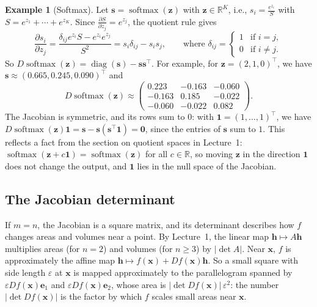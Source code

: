 \documentclass[11pt]{article}
\theoremstyle{definition}
\newtheorem{example}[definition]{Example}
\theoremstyle{plain}
\theoremstyle{remark}
\DeclareMathOperator{\diag}{diag}
\DeclareMathOperator{\softmax}{softmax}
\begin{document}
\begin{example}[Softmax]\label{ex:softmax-jacobian}
    Let $\mathbf{s} = \softmax(\mathbf{z})$ with $\mathbf{z} \in \mathbb{R}^K$, i.e., $s_i = \frac{e^{z_i}}{S}$ with $S = e^{z_1} + \cdots + e^{z_K}$. Since $\frac{\partial S}{\partial z_j} = e^{z_j}$, the quotient rule gives
    \[\frac{\partial s_i}{\partial z_j} = \frac{\delta_{ij} e^{z_i} S - e^{z_i} e^{z_j}}{S^2} = s_i \delta_{ij} - s_i s_j, \qquad \text{where } \delta_{ij} = \begin{cases} 1 & \text{if } i = j, \\ 0 & \text{if } i \neq j. \end{cases}\]
    So $D\softmax(\mathbf{z}) = \diag(\mathbf{s}) - \mathbf{s}\mathbf{s}^\top$. For example, for $\mathbf{z} = (2, 1, 0)^\top$, we have $\mathbf{s} \approx (0.665, 0.245, 0.090)^\top$ and
    \[D\softmax(\mathbf{z}) \approx \begin{pmatrix} 0.223 & -0.163 & -0.060 \\ -0.163 & 0.185 & -0.022 \\ -0.060 & -0.022 & 0.082 \end{pmatrix}.\]
    The Jacobian is symmetric, and its rows sum to $0$: with $\mathbf{1} = (1, \ldots, 1)^\top$, we have $D\softmax(\mathbf{z})\mathbf{1} = \mathbf{s} - \mathbf{s}(\mathbf{s}^\top \mathbf{1}) = \mathbf{0}$, since the entries of $\mathbf{s}$ sum to $1$. This reflects a fact from the section on quotient spaces in Lecture~1: $\softmax(\mathbf{z} + c\mathbf{1}) = \softmax(\mathbf{z})$ for all $c \in \mathbb{R}$, so moving $\mathbf{z}$ in the direction $\mathbf{1}$ does not change the output, and $\mathbf{1}$ lies in the null space of the Jacobian.
\end{example}

\subsection{The Jacobian determinant}

If $m = n$, the Jacobian is a square matrix, and its determinant describes how $f$ changes areas and volumes near a point. By Lecture~1, the linear map $\mathbf{h} \mapsto A\mathbf{h}$ multiplies areas (for $n = 2$) and volumes (for $n \geq 3$) by $|\det A|$. Near $\mathbf{x}$, $f$ is approximately the affine map $\mathbf{h} \mapsto f(\mathbf{x}) + Df(\mathbf{x})\mathbf{h}$. So a small square with side length $\varepsilon$ at $\mathbf{x}$ is mapped approximately to the parallelogram spanned by $\varepsilon Df(\mathbf{x})\mathbf{e}_1$ and $\varepsilon Df(\mathbf{x})\mathbf{e}_2$, whose area is $|\det Df(\mathbf{x})| \, \varepsilon^2$: the number $|\det Df(\mathbf{x})|$ is the factor by which $f$ scales small areas near $\mathbf{x}$.
\end{document}
